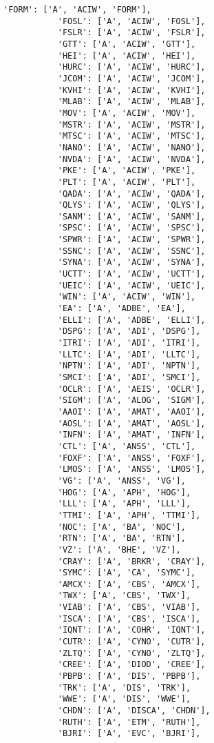\documentclass[11pt]{article}
\begin{document}
\begin{Verbatim}[commandchars=\\\{\}]
           'FORM': ['A', 'ACIW', 'FORM'],
           'FOSL': ['A', 'ACIW', 'FOSL'],
           'FSLR': ['A', 'ACIW', 'FSLR'],
           'GTT': ['A', 'ACIW', 'GTT'],
           'HEI': ['A', 'ACIW', 'HEI'],
           'HURC': ['A', 'ACIW', 'HURC'],
           'JCOM': ['A', 'ACIW', 'JCOM'],
           'KVHI': ['A', 'ACIW', 'KVHI'],
           'MLAB': ['A', 'ACIW', 'MLAB'],
           'MOV': ['A', 'ACIW', 'MOV'],
           'MSTR': ['A', 'ACIW', 'MSTR'],
           'MTSC': ['A', 'ACIW', 'MTSC'],
           'NANO': ['A', 'ACIW', 'NANO'],
           'NVDA': ['A', 'ACIW', 'NVDA'],
           'PKE': ['A', 'ACIW', 'PKE'],
           'PLT': ['A', 'ACIW', 'PLT'],
           'QADA': ['A', 'ACIW', 'QADA'],
           'QLYS': ['A', 'ACIW', 'QLYS'],
           'SANM': ['A', 'ACIW', 'SANM'],
           'SPSC': ['A', 'ACIW', 'SPSC'],
           'SPWR': ['A', 'ACIW', 'SPWR'],
           'SSNC': ['A', 'ACIW', 'SSNC'],
           'SYNA': ['A', 'ACIW', 'SYNA'],
           'UCTT': ['A', 'ACIW', 'UCTT'],
           'UEIC': ['A', 'ACIW', 'UEIC'],
           'WIN': ['A', 'ACIW', 'WIN'],
           'EA': ['A', 'ADBE', 'EA'],
           'ELLI': ['A', 'ADBE', 'ELLI'],
           'DSPG': ['A', 'ADI', 'DSPG'],
           'ITRI': ['A', 'ADI', 'ITRI'],
           'LLTC': ['A', 'ADI', 'LLTC'],
           'NPTN': ['A', 'ADI', 'NPTN'],
           'SMCI': ['A', 'ADI', 'SMCI'],
           'OCLR': ['A', 'AEIS', 'OCLR'],
           'SIGM': ['A', 'ALOG', 'SIGM'],
           'AAOI': ['A', 'AMAT', 'AAOI'],
           'AOSL': ['A', 'AMAT', 'AOSL'],
           'INFN': ['A', 'AMAT', 'INFN'],
           'CTL': ['A', 'ANSS', 'CTL'],
           'FOXF': ['A', 'ANSS', 'FOXF'],
           'LMOS': ['A', 'ANSS', 'LMOS'],
           'VG': ['A', 'ANSS', 'VG'],
           'HOG': ['A', 'APH', 'HOG'],
           'LLL': ['A', 'APH', 'LLL'],
           'TTMI': ['A', 'APH', 'TTMI'],
           'NOC': ['A', 'BA', 'NOC'],
           'RTN': ['A', 'BA', 'RTN'],
           'VZ': ['A', 'BHE', 'VZ'],
           'CRAY': ['A', 'BRKR', 'CRAY'],
           'SYMC': ['A', 'CA', 'SYMC'],
           'AMCX': ['A', 'CBS', 'AMCX'],
           'TWX': ['A', 'CBS', 'TWX'],
           'VIAB': ['A', 'CBS', 'VIAB'],
           'ISCA': ['A', 'CBS', 'ISCA'],
           'IQNT': ['A', 'COHR', 'IQNT'],
           'CUTR': ['A', 'CYNO', 'CUTR'],
           'ZLTQ': ['A', 'CYNO', 'ZLTQ'],
           'CREE': ['A', 'DIOD', 'CREE'],
           'PBPB': ['A', 'DIS', 'PBPB'],
           'TRK': ['A', 'DIS', 'TRK'],
           'WWE': ['A', 'DIS', 'WWE'],
           'CHDN': ['A', 'DISCA', 'CHDN'],
           'RUTH': ['A', 'ETM', 'RUTH'],
           'BJRI': ['A', 'EVC', 'BJRI'],

\end{Verbatim}
\end{document}
